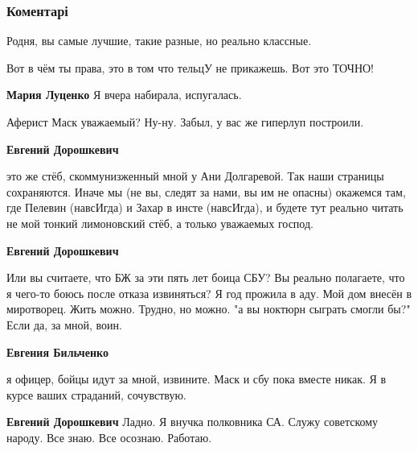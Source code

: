  
 
 
 
 
\subsubsection{Коментарі}

\begin{itemize} %
Родня, вы самые лучшие, такие разные, но реально классные.

Вот в чём ты права, это в том что тельцУ не прикажешь. Вот это ТОЧНО!

\begin{itemize} %
\textbf{Мария Луценко} Я вчера набирала, испугалась.
\end{itemize} %

Аферист Маск уважаемый? Ну-ну. Забыл, у вас же гиперлуп построили.

\begin{itemize} %
\textbf{Евгений Дорошкевич} 

это же стёб, скоммунизженный мной у Ани Долгаревой. Так наши страницы
сохраняются. Иначе мы (не вы, следят за нами, вы им не опасны) окажемся там,
где Пелевин (навсИгда) и Захар в инсте (навсИгда), и будете тут реально читать
не мой тонкий лимоновский стёб, а только уважаемых господ.

\textbf{Евгений Дорошкевич} 

Или вы считаете, что БЖ за эти пять лет боица СБУ? Вы реально полагаете, что я
чего-то боюсь после отказа извиняться? Я год прожила в аду. Мой дом внесён в
миротворец. Жить можно. Трудно, но можно. "а вы ноктюрн сыграть смогли бы?"
Если да, за мной, воин.

\textbf{Евгения Бильченко} 

я офицер, бойцы идут за мной, извините. Маск и сбу пока вместе никак. Я в курсе
ваших страданий, сочувствую.

\textbf{Евгений Дорошкевич} Ладно. Я внучка полковника СА. Служу советскому народу. Все знаю. Все осознаю. Работаю.


\end{itemize}
\end{itemize}
